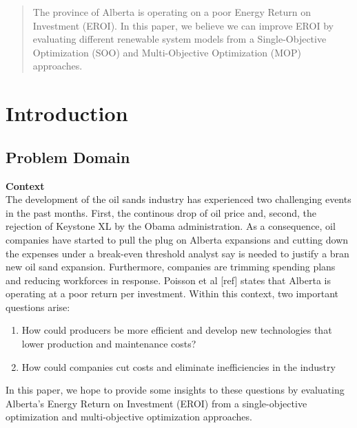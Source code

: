 \documentclass[12pt]{article}
\begin{document}
\lhead{}
\chead{\color{ashgrey}{DRAFT 2015-08-09}}
\rhead{}
\lfoot{}
\maketitle

\begin{abstract}
The province of Alberta is operating on a poor Energy Return on Investment (EROI). In this paper, we believe we can improve EROI by evaluating different renewable system models  from a Single-Objective Optimization (SOO) and Multi-Objective Optimization (MOP) approaches.  
\end{abstract}

\tableofcontents
\newpage

\section{Introduction}

\subsection{Problem Domain}

{\bf Context} \\

The development of the oil sands industry has experienced two challenging events in the past months. First, the continous drop of oil price and, second,  the rejection of Keystone XL by the Obama administration. As a consequence, oil companies have started to pull the plug on Alberta expansions and cutting down the expenses under a break-even threshold analyst say is needed to justify a bran new oil sand expansion. Furthermore, companies are trimming spending plans and reducing workforces in response.  Poisson et al [ref] states that Alberta is operating at a poor return per investment. Within this context, two important questions arise: 
  \begin{enumerate}
  \item How could producers be more efficient and develop new technologies that lower production and maintenance costs?
  \item How could companies cut costs and eliminate inefficiencies in the industry
  \end{enumerate}

In this paper, we hope to provide some insights to these questions by evaluating Alberta's Energy Return on Investment (EROI) from a single-objective optimization and multi-objective optimization approaches. \\
\end{document}

